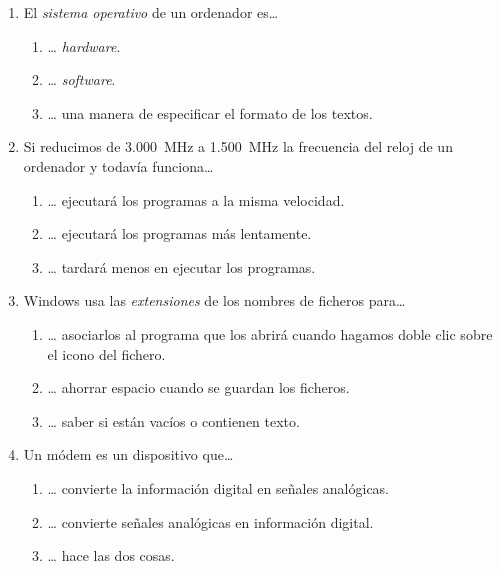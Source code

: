 \begin{enumerate}
\item El \emph{sistema operativo} de un ordenador es{\ldots} \begin{enumerate} \item {\ldots} \emph{hardware}. \item {\ldots} \emph{software}. \item {\ldots} una manera de especificar el formato de los textos. \end{enumerate} 

\item Si reducimos de 3.000~MHz a 1.500~MHz la frecuencia del reloj de un ordenador y todavía funciona{\ldots} \begin{enumerate} \item {\ldots} ejecutará los programas a la misma velocidad. \item {\ldots} ejecutará los programas más lentamente. \item {\ldots} tardará menos en ejecutar los programas. \end{enumerate} 

\item Windows usa las \emph{extensiones} de los nombres de ficheros para{\ldots} \begin{enumerate} \item {\ldots} asociarlos al programa que los abrirá cuando hagamos doble clic sobre el icono del fichero. \item {\ldots} ahorrar espacio cuando se guardan los ficheros. \item {\ldots} saber si están vacíos o contienen texto. \end{enumerate} 

\item Un módem es un dispositivo que{\ldots} \begin{enumerate} \item {\ldots} convierte la información digital en señales analógicas. \item {\ldots} convierte señales analógicas en información digital. \item {\ldots} hace las dos cosas. \end{enumerate} 


\end{enumerate}
